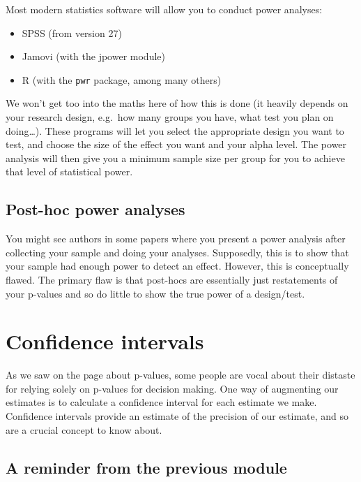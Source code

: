\documentclass[
]{book}
\providecommand{\tightlist}{%
  \setlength{\itemsep}{0pt}\setlength{\parskip}{0pt}}
\begin{document}
Most modern statistics software will allow you to conduct power analyses:

\begin{itemize}
\tightlist
\item
  SPSS (from version 27)
\item
  Jamovi (with the jpower module)
\item
  R (with the \texttt{pwr} package, among many others)
\end{itemize}

We won't get too into the maths here of how this is done (it heavily depends on your research design, e.g.~how many groups you have, what test you plan on doing\ldots). These programs will let you select the appropriate design you want to test, and choose the size of the effect you want and your alpha level. The power analysis will then give you a minimum sample size per group for you to achieve that level of statistical power.

\hypertarget{post-hoc-power-analyses}{%
\subsection{Post-hoc power analyses}\label{post-hoc-power-analyses}}

You might see authors in some papers where you present a power analysis after collecting your sample and doing your analyses. Supposedly, this is to show that your sample had enough power to detect an effect. However, this is conceptually flawed. The primary flaw is that post-hocs are essentially just restatements of your p-values and so do little to show the true power of a design/test.

\hypertarget{confidence-intervals}{%
\section{Confidence intervals}\label{confidence-intervals}}

As we saw on the page about p-values, some people are vocal about their distaste for relying solely on p-values for decision making. One way of augmenting our estimates is to calculate a confidence interval for each estimate we make. Confidence intervals provide an estimate of the precision of our estimate, and so are a crucial concept to know about.

\hypertarget{a-reminder-from-the-previous-module}{%
\subsection{A reminder from the previous module}\label{a-reminder-from-the-previous-module}}
\end{document}

